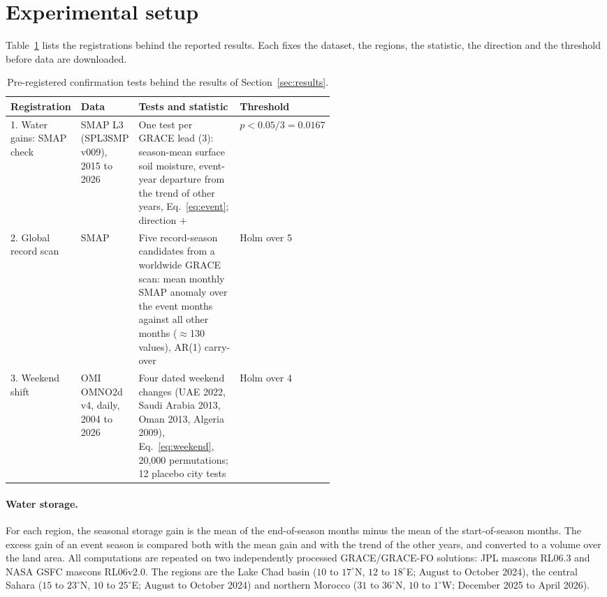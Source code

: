\documentclass[11pt,a4paper]{article}
\begin{document}
\section{Experimental setup}
\label{sec:setup}

Table~\ref{tab:registrations} lists the registrations behind the reported results. Each fixes the dataset, the
regions, the statistic, the direction and the threshold before data are downloaded.

\begin{table}[t]
  \centering\small
  \begin{tabularx}{\linewidth}{@{}p{0.2\linewidth}p{0.17\linewidth}X p{0.17\linewidth}@{}}
    \toprule
    Registration & Data & Tests and statistic & Threshold \\
    \midrule
    1. Water gains: SMAP check & SMAP L3 (SPL3SMP v009), 2015 to 2026 & One test per GRACE lead (3): season-mean surface
      soil moisture, event-year departure from the trend of other years, Eq.~\eqref{eq:event}; direction $+$ &
      $p < 0.05/3 = 0.0167$ \\
    2. Global record scan & SMAP & Five record-season candidates from a worldwide GRACE scan: mean monthly SMAP anomaly
      over the event months against all other months ($\approx$130 values), AR(1) carry-over & Holm over 5 \\
    3. Weekend shift & OMI OMNO2d v4, daily, 2004 to 2026 & Four dated weekend changes (UAE 2022, Saudi Arabia 2013,
      Oman 2013, Algeria 2009), Eq.~\eqref{eq:weekend}, 20{,}000 permutations; 12 placebo city tests & Holm over 4 \\
    \bottomrule
  \end{tabularx}
  \caption{Pre-registered confirmation tests behind the results of Section~\ref{sec:results}.}
  \label{tab:registrations}
\end{table}

\paragraph{Water storage.} For each region, the seasonal storage gain is the mean of the end-of-season months minus the
mean of the start-of-season months. The excess gain of an event season is compared both with the mean gain and with
the trend of the other years, and converted to a volume over the land area. All computations are repeated on two
independently processed GRACE/GRACE-FO solutions: JPL mascons RL06.3 and NASA GSFC mascons RL06v2.0. The regions are
the Lake Chad basin ($10$ to $17^\circ$N, $12$ to $18^\circ$E; August to October 2024), the central Sahara
($15$ to $23^\circ$N, $10$ to $25^\circ$E; August to October 2024) and northern Morocco ($31$ to $36^\circ$N,
$10$ to $1^\circ$W; December 2025 to April 2026).
\end{document}
